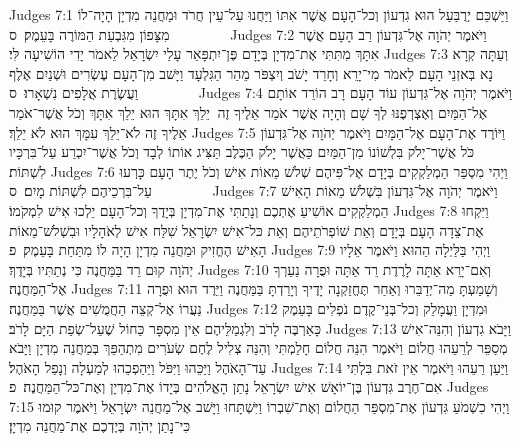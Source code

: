 Judges 7:1	וַיַּשְׁכֵּם יְרֻבַּעַל הוּא גִדְעוֹן וְכל־הָעָם אֲשֶׁר אִתּוֹ וַיַּחֲנוּ עַל־עֵין חֲרֹד וּמַחֲנֵה מִדְיָן הָיָה־לוֹ מִצָּפוֹן מִגִּבְעַת הַמּוֹרֶה בָּעֵמֶק׃ {ס}        
Judges 7:2	וַיֹּאמֶר יְהֹוָה אֶל־גִּדְעוֹן רַב הָעָם אֲשֶׁר אִתָּךְ מִתִּתִּי אֶת־מִדְיָן בְּיָדָם פֶּן־יִתְפָּאֵר עָלַי יִשְׂרָאֵל לֵאמֹר יָדִי הוֹשִׁיעָה לִּי׃
Judges 7:3	וְעַתָּה קְרָא נָא בְּאזְנֵי הָעָם לֵאמֹר מִי־יָרֵא וְחָרֵד יָשֹׁב וְיִצְפֹּר מֵהַר הַגִּלְעָד וַיָּשׁב מִן־הָעָם עֶשְׂרִים וּשְׁנַיִם אֶלֶף וַעֲשֶׂרֶת אֲלָפִים נִשְׁאָרוּ׃ {ס}        
Judges 7:4	וַיֹּאמֶר יְהֹוָה אֶל־גִּדְעוֹן עוֹד הָעָם רָב הוֹרֵד אוֹתָם אֶל־הַמַּיִם וְאֶצְרְפֶנּוּ לְךָ שָׁם וְהָיָה אֲשֶׁר אֹמַר אֵלֶיךָ זֶה  יֵלֵךְ אִתָּךְ הוּא יֵלֵךְ אִתָּךְ וְכֹל אֲשֶׁר־אֹמַר אֵלֶיךָ זֶה לֹא־יֵלֵךְ עִמָּךְ הוּא לֹא יֵלֵךְ׃
Judges 7:5	וַיּוֹרֶד אֶת־הָעָם אֶל־הַמָּיִם וַיֹּאמֶר יְהֹוָה אֶל־גִּדְעוֹן כֹּל אֲשֶׁר־יָלֹק בִּלְשׁוֹנוֹ מִן־הַמַּיִם כַּאֲשֶׁר יָלֹק הַכֶּלֶב תַּצִּיג אוֹתוֹ לְבָד וְכֹל אֲשֶׁר־יִכְרַע עַל־בִּרְכָּיו לִשְׁתּוֹת׃
Judges 7:6	וַיְהִי מִסְפַּר הַמְלַקְקִים בְּיָדָם אֶל־פִּיהֶם שְׁלֹשׁ מֵאוֹת אִישׁ וְכֹל יֶתֶר הָעָם כָּרְעוּ עַל־בִּרְכֵיהֶם לִשְׁתּוֹת מָיִם׃ {ס}        
Judges 7:7	וַיֹּאמֶר יְהֹוָה אֶל־גִּדְעוֹן בִּשְׁלֹשׁ מֵאוֹת הָאִישׁ הַמְלַקְקִים אוֹשִׁיעַ אֶתְכֶם וְנָתַתִּי אֶת־מִדְיָן בְּיָדֶךָ וְכל־הָעָם יֵלְכוּ אִישׁ לִמְקֹמוֹ׃
Judges 7:8	וַיִּקְחוּ אֶת־צֵדָה הָעָם בְּיָדָם וְאֵת שׁוֹפְרֹתֵיהֶם וְאֵת כּל־אִישׁ יִשְׂרָאֵל שִׁלַּח אִישׁ לְאֹהָלָיו וּבִשְׁלֹשׁ־מֵאוֹת הָאִישׁ הֶחֱזִיק וּמַחֲנֵה מִדְיָן הָיָה לוֹ מִתַּחַת בָּעֵמֶק׃ {פ}
Judges 7:9	וַיְהִי בַּלַּיְלָה הַהוּא וַיֹּאמֶר אֵלָיו יְהֹוָה קוּם רֵד בַּמַּחֲנֶה כִּי נְתַתִּיו בְּיָדֶךָ׃
Judges 7:10	וְאִם־יָרֵא אַתָּה לָרֶדֶת רֵד אַתָּה וּפֻרָה נַעַרְךָ אֶל־הַמַּחֲנֶה׃
Judges 7:11	וְשָׁמַעְתָּ מַה־יְדַבֵּרוּ וְאַחַר תֶּחֱזַקְנָה יָדֶיךָ וְיָרַדְתָּ בַּמַּחֲנֶה וַיֵּרֶד הוּא וּפֻרָה נַעֲרוֹ אֶל־קְצֵה הַחֲמֻשִׁים אֲשֶׁר בַּמַּחֲנֶה׃
Judges 7:12	וּמִדְיָן וַעֲמָלֵק וְכל־בְּנֵי־קֶדֶם נֹפְלִים בָּעֵמֶק כָּאַרְבֶּה לָרֹב וְלִגְמַלֵּיהֶם אֵין מִסְפָּר כַּחוֹל שֶׁעַל־שְׂפַת הַיָּם לָרֹב׃
Judges 7:13	וַיָּבֹא גִדְעוֹן וְהִנֵּה־אִישׁ מְסַפֵּר לְרֵעֵהוּ חֲלוֹם וַיֹּאמֶר הִנֵּה חֲלוֹם חָלַמְתִּי וְהִנֵּה צְלִיל לֶחֶם שְׂעֹרִים מִתְהַפֵּךְ בְּמַחֲנֵה מִדְיָן וַיָּבֹא עַד־הָאֹהֶל וַיַּכֵּהוּ וַיִּפֹּל וַיַּהַפְכֵהוּ לְמַעְלָה וְנָפַל הָאֹהֶל׃
Judges 7:14	וַיַּעַן רֵעֵהוּ וַיֹּאמֶר אֵין זֹאת בִּלְתִּי אִם־חֶרֶב גִּדְעוֹן בֶּן־יוֹאָשׁ אִישׁ יִשְׂרָאֵל נָתַן הָאֱלֹהִים בְּיָדוֹ אֶת־מִדְיָן וְאֶת־כּל־הַמַּחֲנֶה׃ {פ}
Judges 7:15	וַיְהִי כִשְׁמֹעַ גִּדְעוֹן אֶת־מִסְפַּר הַחֲלוֹם וְאֶת־שִׁבְרוֹ וַיִּשְׁתָּחוּ וַיָּשׁב אֶל־מַחֲנֵה יִשְׂרָאֵל וַיֹּאמֶר קוּמוּ כִּי־נָתַן יְהֹוָה בְּיֶדְכֶם אֶת־מַחֲנֵה מִדְיָן׃
